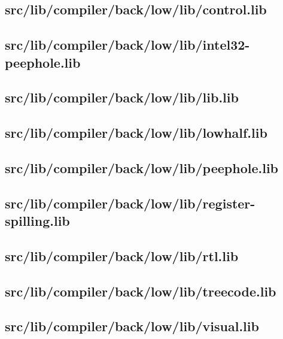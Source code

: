 \subsection{src/lib/compiler/back/low/lib/control.lib}


\subsection{src/lib/compiler/back/low/lib/intel32-peephole.lib}


\subsection{src/lib/compiler/back/low/lib/lib.lib}


\subsection{src/lib/compiler/back/low/lib/lowhalf.lib}


\subsection{src/lib/compiler/back/low/lib/peephole.lib}


\subsection{src/lib/compiler/back/low/lib/register-spilling.lib}


\subsection{src/lib/compiler/back/low/lib/rtl.lib}


\subsection{src/lib/compiler/back/low/lib/treecode.lib}


\subsection{src/lib/compiler/back/low/lib/visual.lib}


